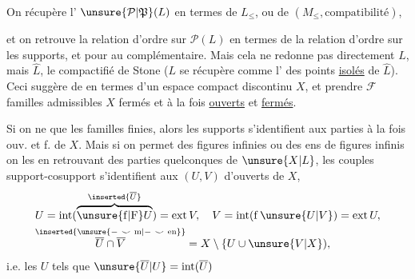 On récupère l' $\unsure{\mathcal P|\mathfrak P}(L)$ en termes de $L_{\leq}$, ou de $(M_{\leq},\text{compatibilité})$,


et on retrouve la relation d'ordre sur $\mathcal P(L)$ en termes de la relation d'ordre sur les supports, et  pour  au complémentaire. Mais cela ne redonne pas directement $L$, mais $\widehat L$, le compactifié de Stone ($L$ se récupère  comme l' des points \uline{isolés} de $\widehat L$). Ceci suggère de   en termes d'un espace compact  discontinu $X$, et  prendre $\mathcal F$ familles admissibles  $X$ fermés et  à la fois \uline{ouverts} et \uline{fermés}.

Si on ne  que les familles finies, alors les supports   s'identifient aux parties à la fois ouv. et f. de $X$. Mais
si on permet des figures infinies ou des ens de figures infinis on les  en retrouvant   des parties  quelconques de $\unsure{X|L}$,  les  couples support-cosupport s'identifient aux   $(U,V)$ d'ouverts de $X$,
\[
\begin{aligned}
& U=\operatorname{int}(\overbrace{\unsure{\mathrm f|\mathrm F}U}^{\inserted{\overline U}})=\operatorname{ext}V,\quad
 V=\operatorname{int}(\mathrm f\,\unsure{U|V})=\operatorname{ext}U,\\
& \overset{\inserted{\unsure{-\ \smile\ \mathrm m|-\ \smile\ \mathrm{en}}}}{\overline U\cap\overline V} = X\setminus\{U\cup\unsure{V|X}),
\end{aligned}
\]
i.e. les  $U$ tels que $\unsure{\overline U|U}=\operatorname{int}(\overline U)$
